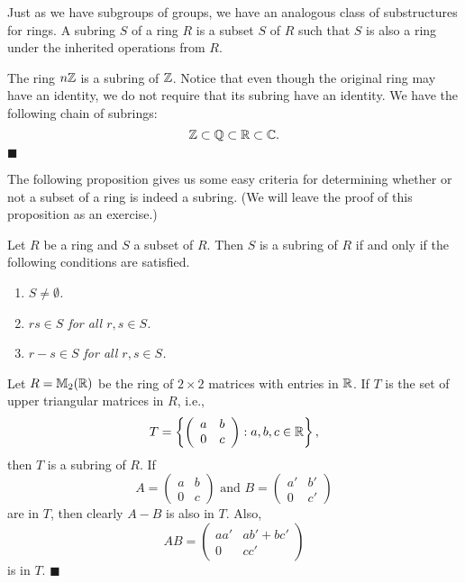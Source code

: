  
\vspace{2ex}
 
 
Just as we have subgroups of groups, we have an analogous class of 
\mbox{substructures} for rings. A {\bfi subring} $S$ 
of a ring
$R$ is a subset $S$ of $R$ such that $S$ is also a ring under the
inherited operations from $R$.
 
 
\vspace{2ex}
 
 
The ring $n {\Bbb Z}$ is a subring of ${\Bbb Z}$.  Notice that even
though the original ring may have an identity, we do not require
that its subring have an identity. We have the following chain of
subrings: 
\[
{\Bbb Z} \subset {\Bbb Q} \subset {\Bbb R} \subset {\Bbb C}.
\]
\hspace{\fill} $\blacksquare$
 
 
\vspace{2ex}
 
 
The following proposition gives us some easy criteria for determining
whether or not a  subset of a ring is indeed a subring. (We will leave
the proof of this proposition as an exercise.)
 
 
\begin{proposition}
Let $R$ be a ring and $S$ a subset of $R$.  Then $S$ is a subring of
$R$ if and only if the following conditions are satisfied. 
\begin{enumerate}
 
\rm \item \it
$S \neq \emptyset$.
 
\rm \item \it
$rs \in S$ for all $r, s \in S$.
 
\rm \item \it
$r-s \in S$ for all $r, s \in S$.
 
\end{enumerate}
\end{proposition}
 
 
Let  $R ={\Bbb M}_2( {\Bbb R} )$ be the ring of $2 \times 2$ matrices
with entries in ${\Bbb R}$. If $T$ is the set of upper triangular
matrices in $R$, i.e.,
\[
T =
\left\{
\left(
\begin{array}{cc}
a & b \\
0 & c
\end{array}
\right)
: a, b, c \in {\Bbb R}
\right\},
\]
then $T$ is a subring of $R$. If
\[
A=
\left(
\begin{array}{cc}
a & b \\
0 & c
\end{array}
\right)
\mbox{ and }
B =
\left(
\begin{array}{cc}
a' & b' \\
0 & c'
\end{array}
\right)
\]
are in $T$, then clearly $A-B$ is also in $T$. Also,
\[
AB =
\left(
\begin{array}{cc}
a a' & ab' + bc' \\
0 & cc'
\end{array}
\right)
\]
is in $T$.
\hspace{\fill} $\blacksquare$
 
